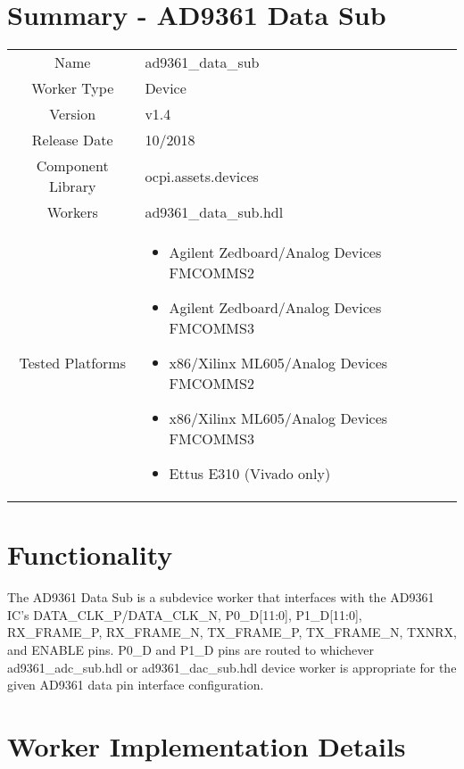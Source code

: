 \documentclass{article}
\author{} %
\date{Version \docVersion} %
\title{\docTitle}
\def\docVersion{1.4}
\def\comp{ad9361\_data\_sub}
\def\Comp{AD9361 Data Sub}
\begin{document}
\section*{Summary - \Comp}
\begin{tabular}{|c|M{13.5cm}|}
	\hline
	                  &                  \\
	\hline
	Name              & \comp            \\
	\hline
	Worker Type       & Device           \\
	\hline
	Version           & v\docVersion     \\
	\hline
	Release Date      & 10/2018         \\
	\hline
	Component Library & ocpi.assets.devices     \\
	\hline
	Workers           & \comp.hdl        \\
	\hline
	Tested Platforms  &
\begin{itemize}
  \item Agilent Zedboard/Analog Devices FMCOMMS2
  \item Agilent Zedboard/Analog Devices FMCOMMS3
  \item x86/Xilinx ML605/Analog Devices FMCOMMS2
  \item x86/Xilinx ML605/Analog Devices FMCOMMS3
  \item Ettus E310 (Vivado only)
\end{itemize} \\
	\hline
\end{tabular}

\section*{Functionality}
	The \Comp{} is a subdevice worker that interfaces with the AD9361 IC\cite{ad9361}'s DATA\_CLK\_P/DATA\_CLK\_N, P0\_D[11:0], P1\_D[11:0], RX\_FRAME\_P, RX\_FRAME\_N, TX\_FRAME\_P, TX\_FRAME\_N, TXNRX, and ENABLE pins. P0\_D and P1\_D pins are routed to whichever ad9361\_adc\_sub.hdl or ad9361\_dac\_sub.hdl device worker is appropriate for the given AD9361 data pin interface configuration.

\section*{Worker Implementation Details}
\end{document}
